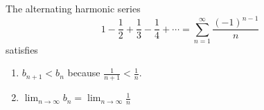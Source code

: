 \begin{frame}
\begin{example} %
The alternating harmonic series
\abovedisplayskip=0pt
\belowdisplayskip=0pt
\[
1 - \frac{1}{2} + \frac{1}{3} - \frac{1}{4} + \cdots = \sum_{n=1}^\infty \frac{(-1)^{n-1}}{n}
\]
satisfies
\begin{enumerate}
\item  $b_{n+1} < b_n$ because $\frac{1}{n+1} < \frac{1}{n}$.
\item  $\lim_{n\to\infty} b_n = $\alert<handout:0| 2-3>{$\lim_{n\to\infty} \frac{1}{n}$  }
\end{enumerate}
\end{example}
\end{frame}
